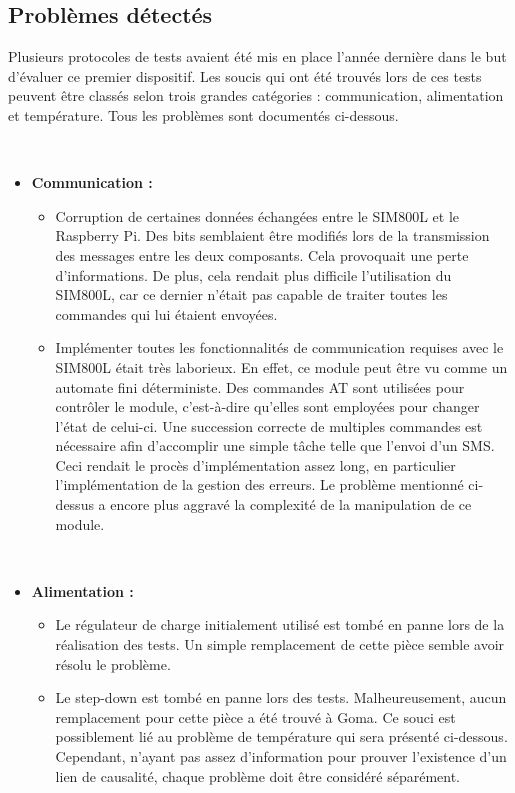 \subsection{Problèmes détectés}

\noindent
Plusieurs protocoles de tests avaient été mis en place l'année dernière dans le but d'évaluer ce premier dispositif. Les soucis qui ont été trouvés lors de ces tests peuvent être classés selon trois grandes catégories : communication, alimentation et température. Tous les problèmes sont documentés ci-dessous.

~

\begin{itemize}
  \item \textbf{Communication :}
  \begin{itemize}
    \item Corruption de certaines données échangées entre le SIM800L et le Raspberry Pi. Des bits semblaient être modifiés lors de la transmission des messages entre les deux composants. Cela provoquait une perte d'informations. De plus, cela rendait plus difficile l'utilisation du SIM800L, car ce dernier n'était pas capable de traiter toutes les commandes qui lui étaient envoyées.

    \item Implémenter toutes les fonctionnalités de communication requises avec le SIM800L était très laborieux. En effet, ce module peut être vu comme un automate fini déterministe. Des commandes AT sont utilisées pour contrôler le module, c'est-à-dire qu'elles sont employées pour changer l'état de celui-ci. Une succession correcte de multiples commandes est nécessaire afin d'accomplir une simple tâche telle que l'envoi d'un SMS. Ceci rendait le procès d'implémentation assez long, en particulier l'implémentation de la gestion des erreurs. Le problème mentionné ci-dessus a encore plus aggravé la complexité de la manipulation de ce module.
  \end{itemize}

~

  \item \textbf{Alimentation :}
  \begin{itemize}
    \item Le régulateur de charge initialement utilisé est tombé en panne lors de la réalisation des tests. Un simple remplacement de cette pièce semble avoir résolu le problème.

    \item Le step-down est tombé en panne lors des tests. Malheureusement, aucun remplacement pour cette pièce a été trouvé à Goma. Ce souci est possiblement lié au problème de température qui sera présenté ci-dessous. Cependant, n'ayant pas assez d'information pour prouver l'existence d'un lien de causalité, chaque problème doit être considéré séparément.
  \end{itemize}


\end{itemize}
